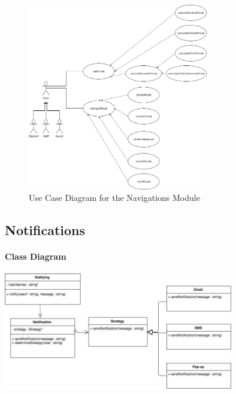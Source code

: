 \documentclass[runningheads,a4paper]{article}
\begin{document}
\begin{figure}[H]
   	\centering
   	\includegraphics[width=0.7\textwidth]{Navigation-Module-Use-Case.jpg}
   	\caption{Use Case Diagram for the Navigations Module}
\end{figure}


\subsection {Notifications}

\paragraph{Class Diagram}
\begin{center}
\includegraphics[width=10cm]{ClassDiagram.png}\\
\end{center}
\end{document}

